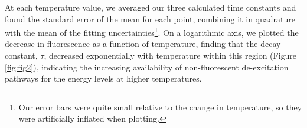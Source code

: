 \documentclass[12pt]{report}
\begin{document}
At each temperature value, we averaged our three calculated time constants and found the standard error of the mean for each point, combining it in quadrature with the mean of the fitting uncertainties\footnote{Our error bars were quite small relative to the change in temperature, so they were artificially inflated when plotting.}. On a logarithmic axis, we plotted the decrease in fluorescence as a function of temperature, finding that the decay constant, $\tau$, decreased exponentially with temperature within this region (Figure\,\ref{fig:fig2}), indicating the increasing availability of non-fluorescent de-excitation pathways for the  energy levels at higher temperatures.

\printbibliography
\end{document}

